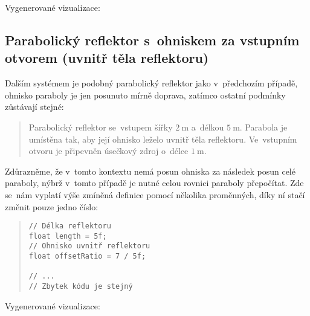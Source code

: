 \beautypage

Vygenerované vizualizace:



\beautypage

\subsection[Parabolický reflektor s~ohniskem za vstupním otvorem]{Parabolický reflektor s~ohniskem za vstupním otvorem (uvnitř těla reflektoru)}

Dalším systémem je podobný parabolický reflektor jako v~předchozím případě, ohnisko paraboly je jen posunuto mírně doprava, zatímco ostatní podmínky zůstávají stejné:

\begin{quote}
    Parabolický reflektor se~vstupem šířky $2\ \mathrm{m}$ a~délkou $5\ \mathrm{m}$. Parabola je umístěna tak, aby její ohnisko leželo uvnitř těla reflektoru. Ve~vstupním otvoru je připevněn úsečkový zdroj o~délce $1\ \mathrm{m}$.
\end{quote}

Zdůrazněme, že v~tomto kontextu nemá posun ohniska za následek posun celé paraboly, nýbrž v~tomto případě je nutné celou rovnici paraboly přepočítat. Zde se~nám vyplatí výše zmíněná definice pomocí několika proměnných, díky ní stačí změnit pouze jedno číslo:

\begin{minipage}{\textwidth}\begin{quote}\begin{lstlisting}
// Délka reflektoru
float length = 5f;
// Ohnisko uvnitř reflektoru
float offsetRatio = 7 / 5f;

// ...
// Zbytek kódu je stejný
\end{lstlisting}\end{quote}\end{minipage}

Vygenerované vizualizace:


